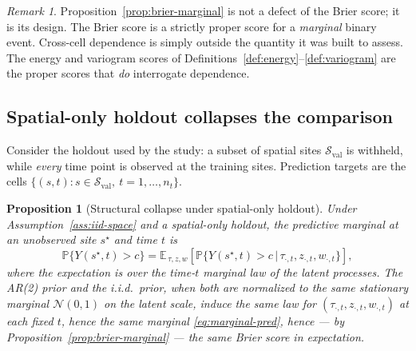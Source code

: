 \documentclass[11pt]{article}
\newtheorem{proposition}{Proposition}
\theoremstyle{definition}
\theoremstyle{remark}
\newtheorem{remark}{Remark}
\newcommand{\E}{\mathbb{E}}
\renewcommand{\Pr}{\mathbb{P}}
\newcommand{\Norm}{\mathcal{N}}
\begin{document}
\begin{remark}
\label{rem:proper}
Proposition~\ref{prop:brier-marginal} is not a defect of the Brier
score; it is its design. The Brier score is a strictly proper score for
a \emph{marginal} binary event. Cross-cell dependence is simply outside
the quantity it was built to assess. The energy and variogram scores of
Definitions~\ref{def:energy}--\ref{def:variogram} are the proper scores
that \emph{do} interrogate dependence.
\end{remark}

\subsection{Spatial-only holdout collapses the comparison}

Consider the holdout used by the study: a subset of spatial sites
$\mathcal{S}_{\text{val}}$ is withheld, while \emph{every} time point is
observed at the training sites. Prediction targets are the cells
$\{(s,t): s\in\mathcal{S}_{\text{val}},\ t = 1,\dots,n_t\}$.

\begin{proposition}[Structural collapse under spatial-only holdout]
\label{prop:collapse}
Under Assumption~\ref{ass:iid-space} and a spatial-only holdout, the
predictive marginal at an unobserved site $s^\star$ and time $t$ is
\begin{equation}
  \Pr\{Y(s^\star,t) > c\}
  = \E_{\,\tau,z,w}\!\left[
      \Pr\big\{ Y(s^\star,t) > c \,\big|\, \tau_{\cdot,t}, z_{\cdot,t},
                w_{\cdot,t} \big\}
    \right],
  \label{eq:marginal-pred}
\end{equation}
where the expectation is over the time-$t$ \emph{marginal} law of the
latent processes. The AR(2) prior and the i.i.d.\ prior, when both are
normalized to the same stationary marginal $\Norm(0,1)$ on the latent
scale, induce the same law for $(\tau_{\cdot,t}, z_{\cdot,t},
w_{\cdot,t})$ at each fixed $t$, hence the same marginal
\eqref{eq:marginal-pred}, hence --- by
Proposition~\ref{prop:brier-marginal} --- the same Brier score in
expectation.
\end{proposition}
\end{document}
